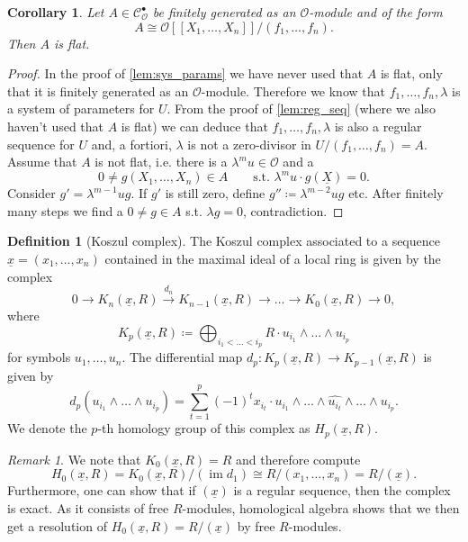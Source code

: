 \documentclass{article}
\theoremstyle{plain}%
\newtheorem{corollary}[theorem]{Corollary}
\theoremstyle{definition}
\newtheorem{definition}[theorem]{Definition}
\theoremstyle{remark}
\newtheorem{remark}[theorem]{Remark}
\newcommand{\cob}{\mathcal{C}_\mathcal{O}^\bullet}
\newcommand{\im}{\operatorname{im}}
\begin{document}
\begin{corollary}\textup{\cite[corollary 5.12]{Darmon1995}}\label{cor:flatness}
    Let \(A \in \cob\) be finitely generated as an \(\mathcal{O}\)-module and of the form
    \[
        A \cong \mathcal{O}[[X_1, \dots, X_n]]/(f_1, \dots, f_n).  
    \]
    Then \(A\) is flat.
\end{corollary}
\begin{proof}
    In the proof of \cref{lem:sys_params} we have never used that \(A\) is flat, 
    only that it is finitely generated as an \(\mathcal{O}\)-module. Therefore we know that \(f_1, \dots, f_n, \lambda\) is a system of parameters
    for \(U\).
    From the proof of \cref{lem:reg_seq} (where we also haven't used that \(A\) is flat) we can deduce that
    \(f_1, \dots, f_n, \lambda\) is also a regular sequence for \(U\) and, a fortiori, \(\lambda\) is not a 
    zero-divisor in \(U/(f_1, \dots, f_n) = A\).
    Assume that \(A\) is not flat, i.e. there is a \(\lambda^m u \in \mathcal{O}\) and a
    \[0 \neq g(X_1, \dots, X_n) \in A \qquad \text{s.t. } \lambda^m u \cdot g(\underline{X}) = 0.\]
    Consider \(g' = \lambda^{m-1}u g\). If \(g'\) is still zero, define \(g''\coloneqq \lambda^{m-2}u g\) etc.
    After finitely many steps we find a \(0 \neq g \in A\) s.t. \(\lambda g = 0\), contradiction.
\end{proof}

\begin{definition}[Koszul complex]\cites[ch. 5.3]{Darmon1995}[\S 16]{Matsumura1986}
    The Koszul complex associated to a sequence \(\underline{x} = (x_1, \dots, x_n)\) contained in the maximal ideal
    of a local ring is given by the complex
    \[
        0 \to K_n(\underline{x}, R) \xrightarrow{d_n} K_{n-1}(\underline{x}, R) \to \dots \to K_{0}(\underline{x},R) \to 0,
    \]
    where 
    \[
        K_p(\underline{x}, R) \coloneqq \bigoplus_{i_1 < \dots < i_p} R \cdot u_{i_1}\wedge\dots\wedge u_{i_p}
    \]
    for symbols \(u_1, \dots, u_n\). The differential map \(d_p\colon K_p(\underline{x}, R) \to K_{p-1}(\underline{x}, R)\)
    is given by
    \[
        d_p(u_{i_1}\wedge\dots\wedge u_{i_p}) = \sum_{t=1}^p(-1)^t x_{i_t} \cdot 
        u_{i_1} \wedge \dots \wedge \widehat{u_{i_t}}\wedge \dots \wedge u_{i_p}.
    \]
    We denote the \(p\)-th homology group of this complex as \(H_p(\underline{x}, R)\).
\end{definition}

\begin{remark}\textup{\cites[proposition 5.13]{Darmon1995}[theorem 16.5 (i)]{Matsumura1986}}\label{rem:koszul}
    We note that \(K_0(\underline{x}, R) = R\) and therefore compute
    \[
        H_0(\underline{x}, R) = K_0(\underline{x}, R)/(\im d_1) \cong R/(x_1, \dots, x_n) = R/(\underline{x}).
    \]
    Furthermore, one can show that if \((\underline{x})\) is a regular sequence, then the complex is exact.
    As it consists of free \(R\)-modules, homological algebra shows that we then get a resolution of
    \(H_0(\underline{x}, R) = R/(\underline{x})\) by free \(R\)-modules. 
\end{remark}
\end{document}
